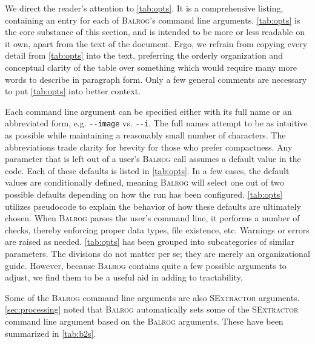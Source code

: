 \documentclass[11pt]{book}
\newcommand{\codett}[1]{\lstinline{#1}}
\newcommand{\balrog}{\textsc{Balrog}}
\newcommand{\sex}{\textsc{SExtractor}}
\newcommand{\opt}[1]{\codett{--#1}}
\begin{document}
We direct the reader's attention to \autoref{tab:opts}.
It is a comprehensive listing, containing an entry for each of \balrog{}'s command line arguments.
\autoref{tab:opts} is the core substance of this section,
and is intended to be more or less readable on it own, apart from the text of the document.
Ergo, we refrain from copying every detail from \autoref{tab:opts} into the text, 
preferring the orderly organization and conceptual clarity
of the table over something which would require many more words to describe in paragraph form.
Only a few general comments are necessary to put \autoref{tab:opts} into better context.

Each command line argument can be specified either with its full name or an abbreviated form, e.g. \opt{image} vs. \opt{i}.
The full names attempt to be as intuitive as possible while maintaining a reasonably small number of characters.
The abbreviations trade clarity for brevity for those who prefer compactness. 
Any parameter that  is left out of a user's \balrog{} call assumes a default value in the code.
Each of these defaults is listed in \autoref{tab:opts}. 
In a few cases, the default values are conditionally defined, meaning \balrog{} will select one out of
two possible defaults depending on how the run has been configured.
\autoref{tab:opts} utilizes pseudocode to explain the behavior of how these defaults are ultimately chosen.
When \balrog{} parses the user's command line, it performs a number of checks, 
thereby enforcing proper data types, file existence, etc.
Warnings or errors are raised as needed.
\autoref{tab:opts} has been grouped into subcategories of similar parameters.
The divisions do not matter per se; they are merely an organizational guide.
However, because \balrog{} contains quite a few possible arguments to adjust,
we find them to be a useful aid in adding to tractability.

Some of the \balrog{} command line arguments are also \sex{} arguments.
\autoref{sec:processing} noted that \balrog{} automatically sets some of the \sex{} command line argument based on the \balrog{} arguments.
These have been summarized in \autoref{tab:b2s}.
\end{document}
